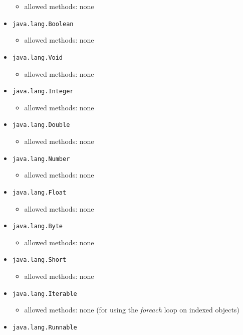 \documentclass[a4paper]{report}
\begin{document}
\begin{itemize}
	\begin{itemize}
	\item allowed methods: none
	\end{itemize}
\item \texttt{java.lang.Boolean}
	\begin{itemize}
	\item allowed methods: none
	\end{itemize}
\item \texttt{java.lang.Void}
	\begin{itemize}
	\item allowed methods: none
	\end{itemize}
\item \texttt{java.lang.Integer}
	\begin{itemize}
	\item allowed methods: none
	\end{itemize}
\item \texttt{java.lang.Double}
	\begin{itemize}
	\item allowed methods: none
	\end{itemize}
\item \texttt{java.lang.Number}
	\begin{itemize}
	\item allowed methods: none
	\end{itemize}
\item \texttt{java.lang.Float}
	\begin{itemize}
	\item allowed methods: none
	\end{itemize}
\item \texttt{java.lang.Byte}
	\begin{itemize}
	\item allowed methods: none
	\end{itemize}
\item \texttt{java.lang.Short}
	\begin{itemize}
	\item allowed methods: none
	\end{itemize}
\item \texttt{java.lang.Iterable}
	\begin{itemize}
	\item allowed methods: none (for using the \emph{foreach} loop on indexed objects)
	\end{itemize}
\item \texttt{java.lang.Runnable}
	\begin{itemize}

\end{itemize}
\end{itemize}
\end{document}
